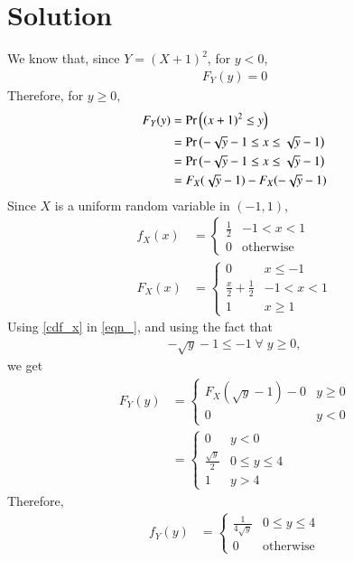 \documentclass[journal,12pt,twocolumn]{IEEEtran}
\begin{document}
\section{Solution}
We know that, since $Y = (X+1)^2$, for $y<0$, 
\begin{align}
F_Y(y) = 0 
\end{align}
Therefore, for $y\geq 0$, 
\begin{align}
F_Y(y) &= \Pr\left((x+1)^2 \leq y\right) \\
&= \Pr\left(-\sqrt{y} - 1 \leq x \leq \sqrt{y} - 1 \right) \\
&= \Pr\left(-\sqrt{y} - 1 \leq x \leq \sqrt{y} - 1 \right) \\
&= F_X(\sqrt{y} - 1) - F_X(-\sqrt{y} - 1) 
\label{eqn_}
\end{align}
Since $X$ is a uniform random variable in $(-1, 1)$,
\begin{align}
f_X(x) &= 
\begin{cases}
\frac{1}{2} & -1 < x < 1 \\
0 & \text{otherwise}
\end{cases}\\
F_X(x) &= 
\begin{cases}
0 & x \leq -1 \\
\frac{x}{2} + \frac{1}{2} & -1 < x < 1 \\
1 & x \geq 1
\end{cases}
\label{cdf_x}
\end{align}
Using \ref{cdf_x} in \ref{eqn_}, and using the fact that 
\begin{align}
-\sqrt{y}-1 \leq -1 \; \forall \; y \geq 0,
\end{align}
we get
\begin{align}
F_Y(y) &=  \begin{cases}
F_X(\sqrt{y} - 1) - 0 & y \geq 0\\
0 & y < 0
\end{cases} \\
&= \begin{cases}
0 & y < 0 \\
\frac{\sqrt{y}}{2}  & 0 \leq y \leq 4\\
1 & y > 4
\end{cases}
\end{align}
Therefore, 
\begin{align}
f_Y(y) &= \begin{cases}
\frac{1}{4\sqrt{y}}  & 0 \leq y \leq 4\\
0 & \text{otherwise}
\end{cases}
\end{align}
\end{document}

